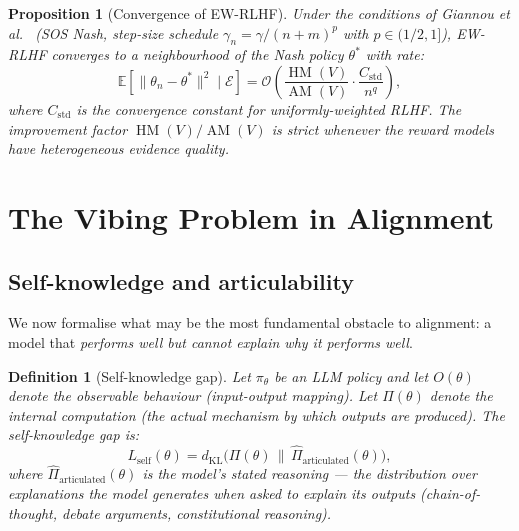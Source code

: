 \documentclass[11pt,a4paper]{article}
\newtheorem{proposition}[theorem]{Proposition}
\newtheorem{definition}[theorem]{Definition}
\DeclareMathOperator{\AM}{AM}
\DeclareMathOperator{\HM}{HM}
\newcommand{\E}{\mathbb{E}}
\newcommand{\cE}{\mathcal{E}}
\begin{document}
\begin{proposition}[Convergence of EW-RLHF]
\label{prop:ew-rlhf-convergence}
Under the conditions of Giannou et al.~\cite{giannou2022} (SOS Nash, step-size schedule $\gamma_n = \gamma/(n+m)^p$ with $p \in (1/2, 1]$), EW-RLHF converges to a neighbourhood of the Nash policy $\theta^*$ with rate:
\begin{equation}
    \E[\|\theta_n - \theta^*\|^2 \mid \cE] = \mathcal{O}\!\left(\frac{\HM(V)}{\AM(V)} \cdot \frac{C_{\mathrm{std}}}{n^q}\right),
\end{equation}
where $C_{\mathrm{std}}$ is the convergence constant for uniformly-weighted RLHF. The improvement factor $\HM(V)/\AM(V)$ is strict whenever the reward models have heterogeneous evidence quality.
\end{proposition}


\section{The Vibing Problem in Alignment}
\label{sec:vibing}

\subsection{Self-knowledge and articulability}

We now formalise what may be the most fundamental obstacle to alignment: a model that \emph{performs well but cannot explain why it performs well}.

\begin{definition}[Self-knowledge gap]
\label{def:self-knowledge}
Let $\pi_\theta$ be an LLM policy and let $O(\theta)$ denote the \emph{observable behaviour} (input-output mapping). Let $\Pi(\theta)$ denote the \emph{internal computation} (the actual mechanism by which outputs are produced). The \emph{self-knowledge gap} is:
\begin{equation}
\label{eq:self-knowledge-gap}
    L_{\mathrm{self}}(\theta) = d_{\mathrm{KL}}\bigl(\Pi(\theta) \,\|\, \hat{\Pi}_{\mathrm{articulated}}(\theta)\bigr),
\end{equation}
where $\hat{\Pi}_{\mathrm{articulated}}(\theta)$ is the model's \emph{stated reasoning} --- the distribution over explanations the model generates when asked to explain its outputs (chain-of-thought, debate arguments, constitutional reasoning).
\end{definition}
\end{document}

